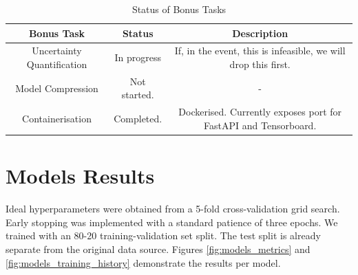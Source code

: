 \documentclass{article}
\begin{document}
\begin{table}[!h]
    \centering
    \begin{tabular}{|c|c|c|}
        \hline
        \textbf{Bonus Task} & \textbf{Status} & \textbf{Description} \\
        \hline
        \hline
        Uncertainty Quantification & In progress & If, in the event, this is infeasible, we will drop this first. \\
        \hline
        Model Compression & Not started. & - \\
        \hline
        Containerisation & Completed. & Dockerised. Currently exposes port for FastAPI and Tensorboard. \\
        \hline
    \end{tabular}
    \caption{Status of Bonus Tasks}
    \label{tab:status_bonus}
\end{table}

\section{Models Results}

Ideal hyperparameters were obtained from a 5-fold cross-validation grid search. Early stopping was implemented with a standard patience of three epochs. We trained with an 80-20 training-validation set split. The test split is already separate from the original data source. Figures \ref{fig:models_metrics} and \ref{fig:models_training_history} demonstrate the results per model.
\end{document}
